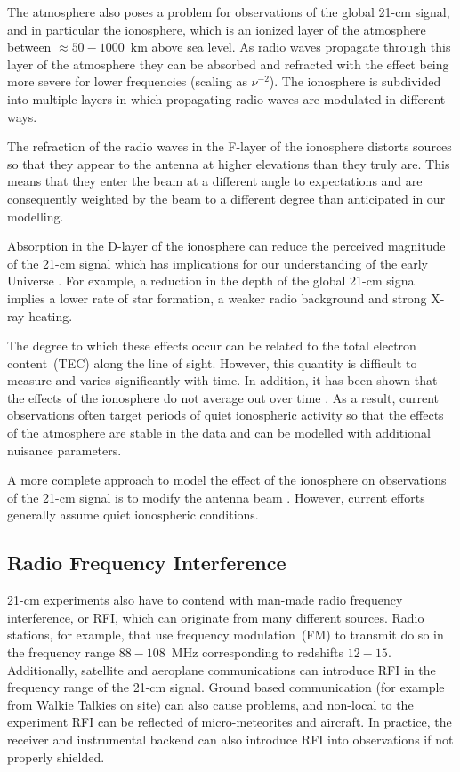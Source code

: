 The atmosphere also poses a problem for observations of the global 21-cm signal, and in particular the ionosphere, which is an ionized layer of the atmosphere between $\approx 50 - 1000$~km above sea level. As radio waves propagate through this layer of the atmosphere they can be absorbed and refracted with the effect being more severe for lower frequencies (scaling as $\nu^{-2}$)\cite{Vedantham_ionosphere_2014, Datta_ionosphere_2014, Shen_ionosphere_2021}. The ionosphere is subdivided into multiple layers in which propagating radio waves are modulated in different ways.

The refraction of the radio waves in the F-layer of the ionosphere distorts sources so that they appear to the antenna at higher elevations than they truly are. This means that they enter the beam at a different angle to expectations and are consequently weighted by the beam to a different degree than anticipated in our modelling.

Absorption in the D-layer of the ionosphere can reduce the perceived magnitude of the 21-cm signal which has implications for our understanding of the early Universe \cite{Shen_ionosphere_2021}. For example, a reduction in the depth of the global 21-cm signal implies a lower rate of star formation, a weaker radio background and strong X-ray heating.

The degree to which these effects occur can be related to the total electron content~(TEC) along the line of sight. However, this quantity is difficult to measure and varies significantly with time. In addition, it has been shown that the effects of the ionosphere do not average out over time \cite{Shen_ionosphere_2021}. As a result, current observations often target periods of quiet ionospheric activity so that the effects of the atmosphere are stable in the data and can be modelled with additional nuisance parameters.

A more complete approach to model the effect of the ionosphere on observations of the 21-cm signal is to modify the antenna beam \cite{Shen_ionosphere_2022}. However, current efforts generally assume quiet ionospheric conditions.

\subsection{Radio Frequency Interference}

21-cm experiments also have to contend with man-made radio frequency interference, or RFI, which can originate from many different sources. Radio stations, for example, that use frequency modulation~(FM) to transmit do so in the frequency range $88 - 108$~MHz corresponding to redshifts $12 - 15$. Additionally, satellite and aeroplane communications can introduce RFI in the frequency range of the 21-cm signal. Ground based communication (for example from Walkie Talkies on site) can also cause problems, and non-local to the experiment RFI can be reflected of micro-meteorites and aircraft. In practice, the receiver and instrumental backend can also introduce RFI into observations if not properly shielded.


